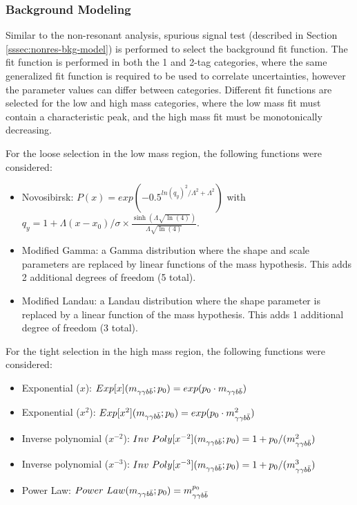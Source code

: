   


\subsubsection{Background Modeling} \label{sssec:res-bkg-model}

Similar to the non-resonant analysis, spurious signal test (described in Section \ref{sssec:nonres-bkg-model}) is performed to select the background fit function. The fit function is performed in both the 1 and 2-tag categories, where the same generalized fit function is required to be used to correlate uncertainties, however the parameter values can differ between categories. Different fit functions are selected for the low and high mass categories, where the low mass fit must contain a characteristic peak, and the high mass fit must be monotonically decreasing.

For the loose selection in the low mass region, the following functions were considered:

\begin{itemize}
  \item Novosibirsk: $P(x) = exp(-0.5^{ln(q_y)^2 / \Lambda^2 + \Lambda^2})$ with $q_{y} = 1 + \Lambda(x-x_0)/\sigma \times \frac{\sinh(\Lambda \sqrt{\ln(4)})}{\Lambda \sqrt{\ln(4)}}$.
  \item Modified Gamma: a Gamma distribution where the shape and scale parameters are replaced by linear functions of the mass hypothesis. This adds 2 additional degrees of freedom (5 total).
  \item Modified Landau: a Landau distribution where the shape parameter is replaced by a linear function of the mass hypothesis. This adds 1 additional degree of freedom (3 total).
\end{itemize}


For the tight selection in the high mass region, the following functions were considered:
\begin{itemize}
  \item Exponential ($x$): $Exp[x](m_{\gamma\gamma b\bar{b}};p_0) = exp(p_0 \cdot m_{\gamma\gamma b\bar{b}})$
  \item Exponential ($x^2$): $Exp[x^2](m_{\gamma\gamma b\bar{b}};p_0) = exp(p_0 \cdot m_{\gamma\gamma b\bar{b}}^{2})$
  \item Inverse polynomial ($x^{-2}$): $Inv\ Poly [x^{-2}](m_{\gamma\gamma b\bar{b}};p_0) = 1 +p_0/(m_{\gamma\gamma b\bar{b}}^{2})$
  \item Inverse polynomial ($x^{-3}$): $Inv\ Poly [x^{-3}](m_{\gamma\gamma b\bar{b}};p_0) = 1 +p_0/(m_{\gamma\gamma b\bar{b}}^{3})$
  \item Power Law: $Power\ Law(m_{\gamma\gamma b\bar{b}};p_0) = m_{\gamma\gamma b\bar{b}}^{p_0}$
\end{itemize}

